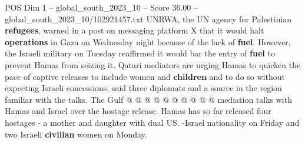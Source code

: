 \begin{textsample}{POS Dim 1 – global\_south\_2023\_10 – Score 36.00 – global\_south\_2023\_10/102921457.txt}
UNRWA, the UN agency for Palestinian \textbf{refugees}, warned in a post on messaging platform X that it would halt \textbf{operations} in Gaza on Wednesday night because of the lack of \textbf{fuel}.
However, the Israeli military on Tuesday reaffirmed it would bar the entry of \textbf{fuel} to prevent Hamas from seizing it.
Qatari mediators are urging Hamas to quicken the pace of captive releases to include women and \textbf{children} and to do so without expecting Israeli concessions, said three diplomats and a source in the region familiar with the talks.
The Gulf @ @ @ @ @ @ @ @ @ @ mediation talks with Hamas and Israel over the hostage release.
Hamas has so far released four hostages - a mother and daughter with dual US. -Israel nationality on Friday and two Israeli \textbf{civilian} women on Monday.

\end{textsample}

